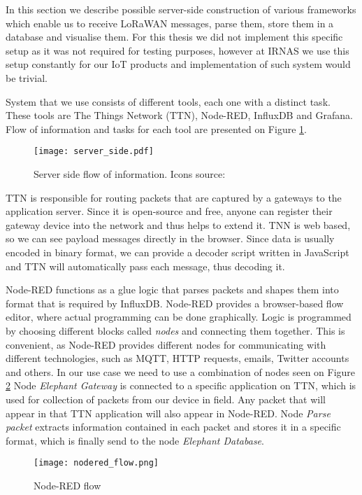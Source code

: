 In this section we describe possible server-side construction of various frameworks which enable us to receive LoRaWAN messages, parse them, store them in a database and visualise them.
For this thesis we did not implement this specific setup as it was not required for testing purposes, however at IRNAS we use this setup constantly for our IoT products and implementation of such system would be trivial.

System that we use consists of different tools, each one with a distinct task.
These tools are The Things Network (TTN), Node-RED, InfluxDB and Grafana.
Flow of information and tasks for each tool are presented on Figure \ref{server_side}.

\begin{figure}[ht]
    \centering
    \texttt{[image: server\_side.pdf]} 
    \caption[Server side flow of information.]{Server side flow of information. Icons source:\cite{icons}}
    \label{server_side}
\end{figure}

TTN is responsible for routing packets that are captured by a gateways to the application server.
Since it is open-source and free, anyone can register their gateway device into the network and thus helps to extend it.
TNN is web based, so we can see payload messages directly in the browser.
Since data is usually encoded in binary format, we can provide a decoder script written in JavaScript and TTN will automatically pass each message, thus decoding it.

Node-RED functions as a glue logic that parses packets and shapes them into format that is required by InfluxDB.
Node-RED provides a browser-based flow editor, where actual programming can be done graphically.
Logic is programmed by choosing different blocks called \textit{nodes} and connecting them together.
This is convenient, as Node-RED provides different nodes for communicating with different technologies, such as MQTT, HTTP requests, emails, Twitter accounts and others.
In our use case we need to use a combination of nodes seen on Figure \ref{nodered_flow}
Node \textit{Elephant Gateway} is connected to a specific application on TTN, which is used for collection of packets from our device in field.
Any packet that will appear in that TTN application will also appear in Node-RED.
Node \textit{Parse packet} extracts information contained in each packet and stores it in a specific format, which is finally send to the node \textit{Elephant Database}.

\begin{figure}[ht]
    \centering
    \texttt{[image: nodered\_flow.png]} 
    \caption{ Node-RED flow}
    \label{nodered_flow}
\end{figure}

